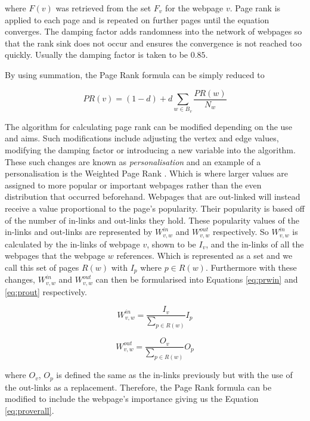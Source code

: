 where $F(v)$ was retrieved from the set $F_v$ for the webpage $v$. Page rank is applied to each page and is repeated on further pages until the equation converges. The damping factor adds randomness into the network of webpages so that the rank sink does not occur and ensures the convergence is not reached too quickly. Usually the damping factor is taken to be $0.85$. 

By using summation, the Page Rank formula can be simply reduced to

\begin{equation}
PR(v) = (1 - d) + d\sum_{w \in B_v}\frac{PR(w)}{N_w}
\end{equation}

The algorithm for calculating page rank can be modified depending on the use and aims. Such modifications include adjusting the vertex and edge values, modifying the damping factor or introducing a new variable into the algorithm. These such changes are known as \emph{personalisation} and an example of a personalisation is the Weighted Page Rank \cite{xing2004weighted}. Which is where larger values are assigned to more popular or important webpages rather than the even distribution that occurred beforehand. Webpages that are out-linked will instead receive a value proportional to the page's popularity. Their popularity is based off of the number of in-links and out-links they hold. These popularity values of the in-links and out-links are represented by $W^{in}_{v,w}$ and $W^{out}_{v,w}$ respectively. So $W^{in}_{v,w}$ is calculated by the in-links of webpage $v$, shown to be $I_v$, and the in-links of all the webpages that the webpage $w$ references. Which is represented as a set and we call this set of pages $R(w)$ with $I_p$ where $p \in R(w)$. Furthermore with these changes, $W^{in}_{v,w}$ and $W^{out}_{v,w}$ can then be formularised into Equations \ref{eq:prwin} and \ref{eq:prout} respectively.

\begin{equation}\label{eq:prwin}
W^{in}_{v,w} = \frac{I_v}{\sum_{p \in R(w)}}{I_p}
\end{equation}

\begin{equation}\label{eq:prout}
W^{out}_{v,w} = \frac{O_v}{\sum_{p \in R(w)}}{O_p}
\end{equation}

where $O_v$, $O_p$ is defined the same as the in-links previously but with the use of the out-links as a replacement. Therefore, the Page Rank formula can be modified to include the webpage's importance giving us the Equation \ref{eq:proverall}.

